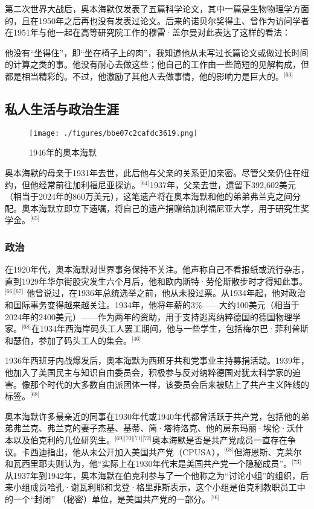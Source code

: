 第二次世界大战后，奥本海默仅发表了五篇科学论文，其中一篇是生物物理学方面的，且在1950年之后再也没有发表过论文。后来的诺贝尔奖得主、曾作为访问学者在1951年与他一起在高等研究院工作的穆雷·盖尔曼对此表达了这样的看法：

他没有“坐得住”，即“坐在椅子上的肉”，我知道他从未写过长篇论文或做过长时间的计算之类的事。他没有耐心去做这些；他自己的工作由一些简短的见解构成，但都是相当精彩的。不过，他激励了其他人去做事情，他的影响力是巨大的。\(^\text{[63]}\)
\subsection{私人生活与政治生涯}
\begin{figure}[ht]
\centering
\texttt{[image: ./figures/bbe07c2cafdc3619.png]}
\caption{1946年的奥本海默} \label{fig_ABHM_4}
\end{figure}
奥本海默的母亲于1931年去世，此后他与父亲的关系更加亲密。尽管父亲仍住在纽约，但他经常前往加利福尼亚探访。\(^\text{[64]}\)1937年，父亲去世，遗留下392,602美元（相当于2024年的860万美元），这笔遗产将在奥本海默和他的弟弟弗兰克之间分配。奥本海默立即立下遗嘱，将自己的遗产捐赠给加利福尼亚大学，用于研究生奖学金。\(^\text{[65]}\)
\subsubsection{政治}

在1920年代，奥本海默对世界事务保持不关注。他声称自己不看报纸或流行杂志，直到1929年华尔街股灾发生六个月后，他和欧内斯特·劳伦斯散步时才得知此事。\(^\text{[66][67]}\) 他曾说过，在1936年总统选举之前，他从未投过票。从1934年起，他对政治和国际事务变得越来越关注。1934年，他将年薪的3\%——大约100美元（相当于2024年的2400美元）——作为两年的资助，用于支持逃离纳粹德国的德国物理学家。\(^\text{[68]}\)在1934年西海岸码头工人罢工期间，他与一些学生，包括梅尔巴·菲利普斯和瑟伯，参加了码头工人的集会。\(^\text{[46]}\)

1936年西班牙内战爆发后，奥本海默为西班牙共和党事业主持募捐活动。1939年，他加入了美国民主与知识自由委员会，积极参与反对纳粹德国对犹太科学家的迫害。像那个时代的大多数自由派团体一样，该委员会后来被贴上了共产主义阵线的标签。\(^\text{[68]}\)

奥本海默许多最亲近的同事在1930年代或1940年代都曾活跃于共产党，包括他的弟弟弗兰克、弗兰克的妻子杰基、基蒂、简·塔特洛克、他的房东玛丽·埃伦·沃什本以及伯克利的几位研究生。\(^\text{[69][70][71][72]}\)奥本海默是否是共产党成员一直存在争议。卡西迪指出，他从未公开加入美国共产党（CPUSA），\(^\text{[68]}\)但海恩斯、克莱尔和瓦西里耶夫则认为，他“实际上在1930年代末是美国共产党一个隐秘成员”。\(^\text{[73]}\)从1937年到1942年，奥本海默在伯克利参与了一个他称之为“讨论小组”的组织，后来小组成员哈孔·谢瓦利耶和戈登·格里菲斯表示，这个小组是伯克利教职员工中的一个“封闭” （秘密）单位，是美国共产党的一部分。\(^\text{[76]}\)

